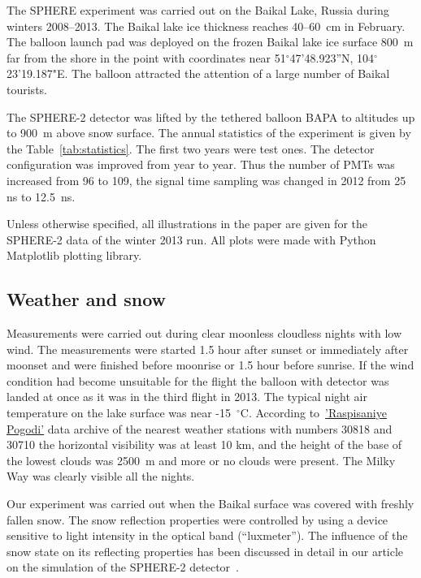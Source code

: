 \documentclass[final,5p,times,twocolumn]{elsarticle}
\begin{document}
The SPHERE experiment was carried out on the Baikal Lake, Russia during winters 2008--2013. The Baikal lake ice thickness reaches 40--60~cm in February. The balloon launch pad was deployed on the frozen Baikal lake ice surface 800~m far from the shore in the point with coordinates near 51$^\circ$47'48.923''N, 104$^\circ$23'19.187"E. 
The balloon attracted the attention of a large number of Baikal tourists. 

The \mbox{SPHERE-2} detector was lifted by the tethered balloon BAPA to altitudes up to 900~m above snow surface. The annual statistics of the experiment is given by the Table~\ref{tab:statistics}. The first two years were test ones. The detector configuration was improved from year to year. Thus the number of PMTs was increased from 96 to 109, the signal time sampling was changed in 2012 from 25 ns to 12.5~ns.

Unless otherwise specified, all illustrations in the paper are given for the \mbox{SPHERE-2} data of the winter 2013 run. All plots were made with Python Matplotlib plotting library.


\subsection{Weather and snow}

Measurements were carried out during clear moonless cloudless nights with low wind. The measurements were started 1.5 hour after sunset or immediately after moonset and were finished before moonrise or 1.5 hour before sunrise. If the wind condition had become unsuitable for the flight the balloon with detector was landed at once as it was in the third flight in 2013. The typical night air temperature on the lake surface was near -15~$^\circ$C. According to~\href{https://rp5.ru/}{'Raspisaniye Pogodi'} data archive of the nearest weather stations with numbers 30818 and 30710 the horizontal visibility was at least 10 km, and the height of the base of the lowest clouds was 2500~m and more or no clouds were present. The Milky Way was clearly visible all the nights.

Our experiment was carried out when the Baikal surface was covered with freshly fallen snow. The snow reflection properties were controlled by using a device sensitive to light intensity in the optical band (“luxmeter”). The influence of the snow state on its reflecting properties has been discussed in detail in our article on the simulation of the SPHERE-2 detector~\cite{ant19}. 
\end{document}
